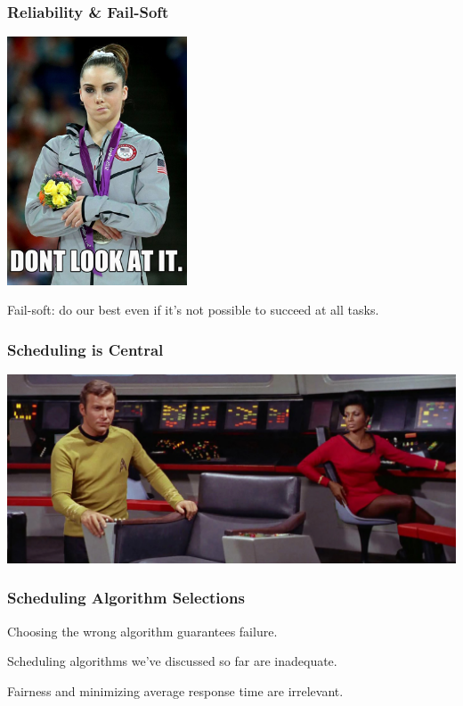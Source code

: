 \begin{frame}
\frametitle{Reliability \& Fail-Soft}

\begin{center}
	\includegraphics[width=0.4\textwidth]{images/silvermedal.jpg}
\end{center}


Fail-soft: do our best even if it's not possible to succeed at all tasks.

\end{frame}

\begin{frame}
\frametitle{Scheduling is Central}

\begin{center}
	\includegraphics[width=\textwidth]{images/captainschair.jpg}
\end{center}

\end{frame}

\begin{frame}
\frametitle{Scheduling Algorithm Selections}

Choosing the wrong algorithm guarantees failure.

Scheduling algorithms we've discussed so far are inadequate.

Fairness and minimizing average response time are irrelevant.

\end{frame}

